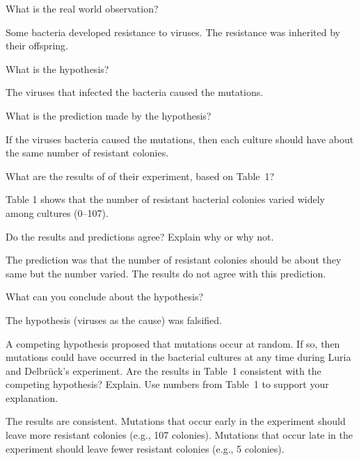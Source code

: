 \documentclass[12pt]{exam}
\newcommand*\AnswerBox[2]{%
    \parbox[t][#1]{0.92\textwidth}{%
    \begin{solution}#2\end{solution}}
    \vspace*{\stretch{1}}
}
\begin{document}
\begin{questions}

\question
What is the real world observation?

\AnswerBox{3\baselineskip}{%
Some bacteria developed resistance to viruses. The resistance
was inherited by their offspring.}

\question
What is the hypothesis?

\AnswerBox{2\baselineskip}{%
The viruses that infected the bacteria caused the mutations.}

\newpage

\question
What is the prediction made by the hypothesis?

\AnswerBox{4\baselineskip}{%
If the viruses bacteria caused the mutations, then each 
	culture should have about the same number of resistant colonies.}


\question
What are the results of of their experiment, based on Table~1?

\AnswerBox{4\baselineskip}{%
Table 1 shows that the number of resistant bacterial colonies varied widely among cultures (0--107).}

\question
Do the results and predictions agree? Explain why or why not.

\AnswerBox{4\baselineskip}{%
The prediction was that the number of resistant colonies should
be about they same but the number varied. The results do not agree 
with this prediction. }

\question
What can you conclude about the hypothesis?

\AnswerBox{4\baselineskip}{%
The hypothesis (viruses as the cause) was falsified.
}

\question[Checkout]
A competing hypothesis proposed that mutations occur at random. If so, then mutations could have occurred in the bacterial cultures at any time during Luria and Delbrück's experiment. Are the results in Table~1 consistent with the competing hypothesis? Explain. Use numbers from Table~1 to support your explanation.

\AnswerBox{5\baselineskip}{%
The results are consistent. Mutations that occur early in the experiment should leave more resistant colonies (e.g., 107 colonies). Mutations that occur late in the experiment should leave fewer resistant colonies (e.g., 5 colonies).}

\end{questions}
\end{document}
